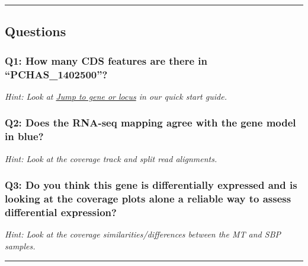 \documentclass[11pt]{article}
\begin{document}
    \begin{center}\rule{0.5\linewidth}{.4pt}\end{center}

    \hypertarget{questions}{%
\subsection{Questions}\label{questions}}

\hypertarget{q1-how-many-cds-features-are-there-in-pchas_1402500}{%
\subsubsection{Q1: How many CDS features are there in
``PCHAS\_1402500''?}\label{q1-how-many-cds-features-are-there-in-pchas_1402500}}

\textit{Hint: Look at
\href{https://github.com/sanger-pathogens/pathogen-informatics-training/blob/master/Notebooks/IGV/index.ipynb}{Jump
to gene or locus} in our quick start guide.}

\hypertarget{q2-does-the-rna-seq-mapping-agree-with-the-gene-model-in-blue}{%
\subsubsection{Q2: Does the RNA-seq mapping agree with the gene model in
blue?}\label{q2-does-the-rna-seq-mapping-agree-with-the-gene-model-in-blue}}

\textit{Hint: Look at the coverage track and split read alignments.}

\hypertarget{q3-do-you-think-this-gene-is-differentially-expressed-and-is-looking-at-the-coverage-plots-alone-a-reliable-way-to-assess-differential-expression}{%
\subsubsection{Q3: Do you think this gene is differentially expressed
and is looking at the coverage plots alone a reliable way to assess
differential
expression?}\label{q3-do-you-think-this-gene-is-differentially-expressed-and-is-looking-at-the-coverage-plots-alone-a-reliable-way-to-assess-differential-expression}}

\textit{Hint: Look at the coverage similarities/differences between the MT
and SBP samples.}

    \begin{center}\rule{0.5\linewidth}{.4pt}\end{center}
\end{document}
